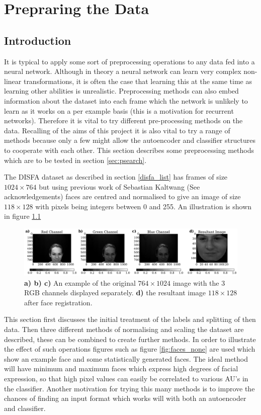 \chapter{Prepraring the Data}
  \section{Introduction}
    It is typical to apply some sort of preprocessing operations to any data fed into
    a neural network. Although in theory a neural network can learn very complex
    non-linear transformations, it is often the case that learning this at the same
    time as learning other abilities is unrealistic. Preprocessing methods can
    also embed information about the dataset into each frame which the network is
    unlikely to learn as it works on a per example basis (this is a motivation for
    recurrent networks).
     Therefore it is vital to try
    different pre-processing methods on the data.
    Recalling of the aims of this project it is also vital to try a range of methods
    because only a few
    might allow the autoencoder and classifier structures to cooperate with each other.
    This section describes some preprocessing methods which are to be
    tested in section \ref{sec:psearch}.


    The DISFA dataset as described in section \ref{disfa_list} has frames of size $ 1024 \times 764 $
    but using previous work of Sebastian Kaltwang (See acknowledgements) faces are
    centred and normalised to give an image of size $118 \times 128$
    with pixels being integers between
    0 and 255. An illustration is shown in figure \ref{fig:sebproc}

    \begin{figure}[!h] \centering
    \includegraphics[width =\hsize]{figures/seb_preproc.pdf}
    \caption{ {\bf a) b) c)} An example of the original $764 \times 1024$ image with
    the 3 RGB channels displayed separately. {\bf d)} the resultant image
    $118 \times 128$ after face registration.} \label{fig:sebproc} \end{figure}


    This section first discusses the initial treatment of the labels and splitting of then data.
    Then three different methods of normalising and scaling
    the dataset are described, these can be combined to create further methods. In order to illustrate
    the effect of such operations figures such as figure \ref{fig:faces_none} are used which
    show an example face and some statistically generated faces. The ideal method will
    have minimum and maximum faces which express high degrees of facial expression, so that
    high pixel values can easily be correlated to various AU's in the classifier. Another motivation
    for trying this many methods is to improve the chances of finding an input format which works will with both an
    autoencoder and classifier.

